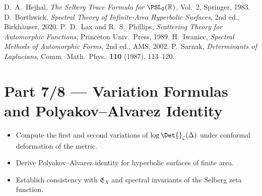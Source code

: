\begin{thebibliography}{9}
 D.~A.~Hejhal, \emph{The Selberg Trace Formula for $\PSL_2(\mathbb{R})$}, Vol.~2, Springer, 1983. %
 D.~Borthwick, \emph{Spectral Theory of Infinite-Area Hyperbolic Surfaces}, 2nd ed., Birkhäuser, 2020. %
 P.~D.~Lax and R.~S.~Phillips, \emph{Scattering Theory for Automorphic Functions}, Princeton Univ.\ Press, 1989. %
 H.~Iwaniec, \emph{Spectral Methods of Automorphic Forms}, 2nd ed., AMS, 2002. %
 P.~Sarnak, \emph{Determinants of Laplacians}, Comm.\ Math.\ Phys.\ \textbf{110} (1987), 113–120. %
\end{thebibliography}


\section*{Part 7/8 — Variation Formulas and Polyakov–Alvarez Identity}\relax\hspace{0pt}

\begin{tcolorbox}[colback=gray!4,colframe=gray!45,title={Scope • C13–C14 (Variational Consistency)}] %
\begin{itemize}
  \item Compute the first and second variations of $\log\Det{}_\zeta(\Delta)$ under conformal deformation of the metric. %
  \item Derive Polyakov–Alvarez identity for hyperbolic surfaces of finite area. %
  \item Establish consistency with $\mathfrak{E}_X$ and spectral invariants of the Selberg zeta function. %
\end{itemize}
\end{tcolorbox}

